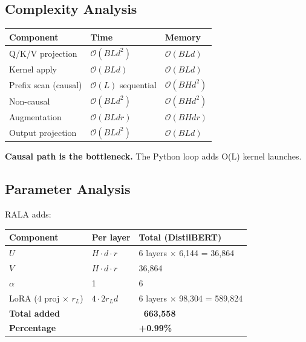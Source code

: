 \subsection{Complexity Analysis}

\begin{table}[H]
\centering
\small
\begin{tabular}{lll}
\toprule
\textbf{Component} & \textbf{Time} & \textbf{Memory} \\
\midrule
Q/K/V projection & $\mathcal{O}(BL d^2)$ & $\mathcal{O}(BLd)$ \\
Kernel apply & $\mathcal{O}(BLd)$ & $\mathcal{O}(BLd)$ \\
Prefix scan (causal) & $\mathcal{O}(L)$ sequential & $\mathcal{O}(BH d^2)$ \\
Non-causal & $\mathcal{O}(BLd^2)$ & $\mathcal{O}(BHd^2)$ \\
Augmentation & $\mathcal{O}(BL d r)$ & $\mathcal{O}(BH d r)$ \\
Output projection & $\mathcal{O}(BLd^2)$ & $\mathcal{O}(BLd)$ \\
\bottomrule
\end{tabular}
\end{table}

\textbf{Causal path is the bottleneck.} The Python loop adds O(L) kernel launches.

\subsection{Parameter Analysis}

RALA adds:

\begin{table}[H]
\centering
\small
\begin{tabular}{lll}
\toprule
\textbf{Component} & \textbf{Per layer} & \textbf{Total (DistilBERT)} \\
\midrule
$U$ & $H \cdot d \cdot r$ & 6 layers $\times$ 6,144 = 36,864 \\
$V$ & $H \cdot d \cdot r$ & 36,864 \\
$\alpha$ & 1 & 6 \\
LoRA ($4$ proj $\times$ $r_L$) & $4 \cdot 2 r_L d$ & 6 layers $\times$ 98,304 = 589,824 \\
\textbf{Total added} &  & \textbf{~663,558} \\
\textbf{Percentage} &  & \textbf{+0.99\%} \\
\bottomrule
\end{tabular}
\end{table}

